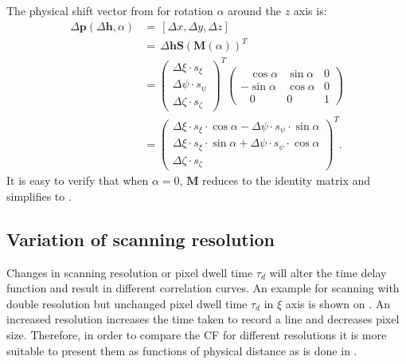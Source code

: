 The physical shift vector from \Eq{~\ref{eq:phys_wangle}} for rotation
$\alpha$ around the $z$ axis is:
\begin{align*}
  \Delta \mathbf{p}(\Delta \mathbf{h},\alpha)
&=\,\left[\Delta x , \Delta y , \Delta z\right]\\
&=
\,\Delta \mathbf{h}\mathbf{S}\left(\mathbf{M}(\alpha)\right)^T\\
&=
\begin{pmatrix}
    \Delta \xi\cdot s_\xi\\
    \Delta \psi\cdot s_\psi\\
    \Delta \zeta \cdot s_\zeta
\end{pmatrix}^T
\begin{pmatrix}
    \,\,\,\,\,\cos\alpha & \sin\alpha & 0\\
    -\sin\alpha & \cos\alpha & 0\\
    \,\,\,\,\,0&0&1
\end{pmatrix}\\
&=\begin{pmatrix}
\Delta \xi\cdot s_\xi\cdot \cos\alpha -  \Delta \psi\cdot s_\psi\cdot \sin\alpha\\
\Delta \xi\cdot s_\xi\cdot \sin\alpha + \Delta \psi\cdot s_\psi\cdot \cos\alpha \\
\Delta \zeta\cdot s_\zeta
\end{pmatrix}^T.
\end{align*}
It is easy to verify that when $\alpha=0$,  $\mathbf{M}$ reduces to the
identity matrix and \Eq{~\ref{eq:G_alpha}} simplifies to
\Eq{~\ref{eq:G_0angle}}.


\subsection{Variation of scanning resolution}
Changes in scanning resolution
\citep{Vendelin_08_AmJPhysiolCellPhysiol_295_pC1302} or pixel dwell time
$\tau_d$ \citep{Groner_10_OptExpress_18_p21225} will alter
the time delay function \Eq{~\ref{eq:timedelay}} and result in different correlation curves.
An example for scanning with double resolution but unchanged pixel dwell
time $\tau_d$ in $\xi$ axis is shown on 
\F{~\ref{fig:rics_theory4}}. An increased resolution increases the time
taken to record a line and decreases pixel
size. Therefore, in order to compare the \ac{CF} for different
resolutions it is more suitable to present them as functions of physical
distance as is done in \F{~\ref{fig:rics_theory4}}. 

